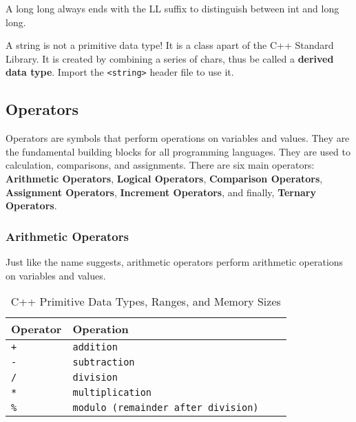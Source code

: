 \documentclass{report}
\begin{document}
\begin{note}
    A long long always ends with the LL suffix to distinguish between int and long long.
\end{note}

\begin{note}
    A string is not a primitive data type! It is a class apart of the C++ Standard Library. It is created by combining a series of chars, thus be called a \textbf{derived data type}. Import the \texttt{<string>} header file to use it.
\end{note}

\subsection{Operators}
Operators are symbols that perform operations on variables and values. They are the fundamental building blocks for all programming languages. They are used to calculation, comparisons, and assignments. There are six main operators: \textbf{Arithmetic Operators}, \textbf{Logical Operators}, \textbf{Comparison Operators}, \textbf{Assignment Operators}, \textbf{Increment Operators}, and finally, \textbf{Ternary Operators}.

\subsubsection{Arithmetic Operators}
Just like the name suggests, arithmetic operators perform arithmetic operations on variables and values. 

\begin{table}[ht]
    \centering
    \begin{center}
    \begin{tabular}{llll}
        \toprule
        Operator & Operation \\
        \midrule
        \texttt{+} & \texttt{addition} \\
        \texttt{-} & \texttt{subtraction} \\
        \texttt{/} & \texttt{division} \\
        \texttt{*} & \texttt{multiplication} \\
        \texttt{\%} & \texttt{modulo (remainder after division)} \\
        \bottomrule
    \end{tabular}
    \end{center}
    \caption{C++ Primitive Data Types, Ranges, and Memory Sizes}
    \label{tab:data-types}
\end{table}
\end{document}
